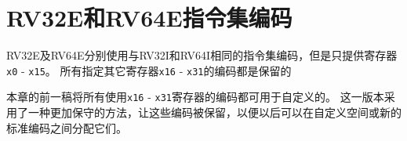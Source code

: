 \section{RV32E和RV64E指令集编码}

RV32E及RV64E分别使用与RV32I和RV64I相同的指令集编码，但是只提供寄存器{\tt x0} - {\tt x15}。
所有指定其它寄存器{\tt x16} - {\tt x31}的编码都是保留的

\begin{commentary}
本章的前一稿将所有使用{\tt x16} - {\tt x31}寄存器的编码都可用于自定义的。
这一版本采用了一种更加保守的方法，让这些编码被保留，以便以后可以在自定义空间或新的标准编码之间分配它们。
\end{commentary}
